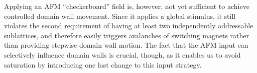 Applying an AFM ``checkerboard'' field is, however, not yet sufficient to achieve controlled domain wall movement.
Since it applies a global stimulus, it still violates the second requirement of having at least two independently addressable sublattices, and therefore easily triggers avalanches of switching magnets rather than providing stepwise domain wall motion.
The fact that the AFM input can selectively influence domain walls is crucial, though, as it enables us to avoid saturation by introducing one last change to this input strategy.


